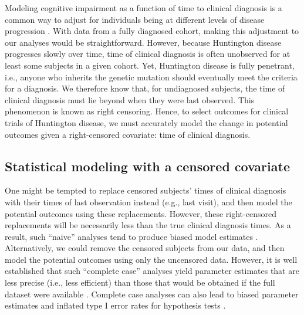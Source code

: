 \documentclass[12pt]{article}
\begin{document}
Modeling cognitive impairment as a function of time to clinical diagnosis is a common way to adjust for individuals being at different levels of disease progression \citep{long2014tracking}. With data from a fully diagnosed cohort, making this adjustment to our analyses would be straightforward. However, because Huntington disease progresses slowly over time, time of clinical diagnosis is often unobserved for at least some subjects in a given cohort. Yet, Huntington disease is fully penetrant, i.e., anyone who inherits the genetic mutation should eventually meet the criteria for a diagnosis. We therefore know that, for undiagnosed subjects, the time of clinical diagnosis must lie beyond when they were last observed. This phenomenon is known as right censoring. Hence, to select outcomes for clinical trials of Huntington disease, we must accurately model the change in potential outcomes given a right-censored covariate: time of clinical diagnosis.

\subsection{Statistical modeling with a censored covariate}

One might be tempted to replace censored subjects' times of clinical diagnosis with their times of last observation instead (e.g., last visit), and then model the potential outcomes using these replacements. However, %
these right-censored replacements will be necessarily less than the true clinical diagnosis times. As a result, such ``naive'' analyses tend to produce biased model estimates \citep{austin2003type}.
Alternatively, we could remove the censored subjects from our data, and then model the potential outcomes using only the uncensored data. %
However, it is well established that such ``complete case'' analyses yield parameter estimates that are less precise (i.e., less efficient) than those that would be obtained if the full dataset were available \citep{ALA}. %
Complete case analyses can also lead to biased parameter estimates and inflated type I error rates for hypothesis tests \citep{austin2003type}. %
\end{document}
